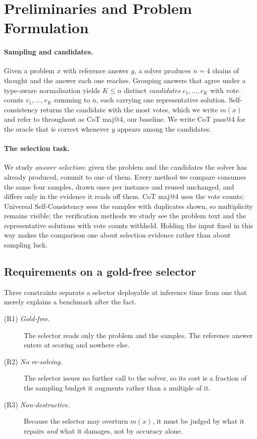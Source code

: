 \section{Preliminaries and Problem Formulation}
\label{sec:prelim}

\paragraph{Sampling and candidates.}
Given a problem $x$ with reference answer $y$, a solver produces $n = 4$ chains
of thought and the answer each one reaches. Grouping answers that agree under a
type-aware normalisation yields $K \le n$ distinct \emph{candidates}
$c_1, \dots, c_K$ with vote counts $v_1, \dots, v_K$ summing to $n$, each
carrying one representative solution. Self-consistency \cite{wang2022self}
returns the candidate with the most votes, which we write $m(x)$ and refer to
throughout as CoT maj@4, our baseline. We write CoT pass@4 for the oracle that
is correct whenever $y$ appears among the candidates.

\paragraph{The selection task.}
We study \emph{answer selection}: given the problem and the candidates the
solver has already produced, commit to one of them. Every method we compare
consumes the same four samples, drawn once per instance and reused unchanged,
and differs only in the evidence it reads off them. CoT maj@4 uses the vote
counts; Universal Self-Consistency \cite{chen2023universal} sees the samples
with duplicates shown, so multiplicity remains visible; the verification
methods we study see the problem text and the representative solutions with
vote counts withheld. Holding the input fixed in this way makes the comparison
one about selection evidence rather than about sampling luck.

\subsection{Requirements on a gold-free selector}
\label{sec:requirements}

Three constraints separate a selector deployable at inference time from one
that merely explains a benchmark after the fact.

\begin{description}
\item[\textnormal{(R1) \emph{Gold-free.}}] The selector reads only the problem
  and the samples. The reference answer enters at scoring and nowhere else.
\item[\textnormal{(R2) \emph{No re-solving.}}] The selector issues no further
  call to the solver, so its cost is a fraction of the sampling budget it
  augments rather than a multiple of it.
\item[\textnormal{(R3) \emph{Non-destructive.}}] Because the selector may
  overturn $m(x)$, it must be judged by what it repairs \emph{and} what it
  damages, not by accuracy alone.
\end{description}

